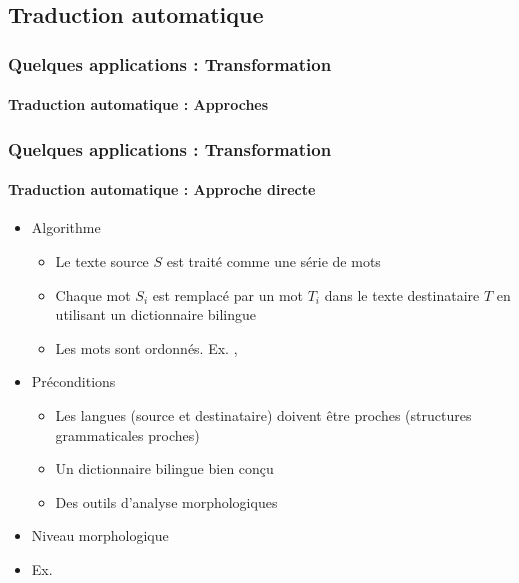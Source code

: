 \documentclass[xcolor=table]{beamer}
\begin{document}
\subsection{Traduction automatique}

\begin{frame}
	\frametitle{Quelques applications : Transformation}
	\framesubtitle{Traduction automatique : Approches}
%	
%	
\end{frame}

\begin{frame}
	\frametitle{Quelques applications : Transformation}
	\framesubtitle{Traduction automatique : Approche directe}
	\begin{itemize}
		\item Algorithme
		\begin{itemize}
			\item Le texte source $S$ est traité comme une série de mots 
			\item Chaque mot $S_i$ est remplacé par un mot $T_i$ dans le texte destinataire $T$ en utilisant un dictionnaire bilingue
			\item Les mots sont ordonnés. Ex. , 
		\end{itemize}
		\item Préconditions 
		\begin{itemize}
			\item Les langues (source et destinataire) doivent être proches (structures grammaticales proches)
			\item Un dictionnaire bilingue bien conçu
			\item Des outils d'analyse morphologiques 
		\end{itemize}
		\item Niveau morphologique 
		\item Ex. 
	\end{itemize}
\end{frame}
\end{document}
